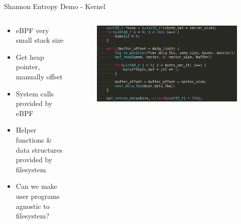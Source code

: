 \documentclass[aspectratio=169, notes]{beamer}
\begin{document}
\begin{frame}{Shannon Entropy Demo - Kernel}
        \begin{columns}
            \begin{column}{0.40\textwidth}
                \footnotesize
                \begin{itemize}
                    \item eBPF very small stack size
                    \item Get heap pointer, manually offset
                    \item System calls provided by eBPF
                    \item Helper functions \& data structures provided
                          by filesystem
                    \item Can we make user programs agnostic to filesystem?
                \end{itemize}
            \end{column}
            \begin{column}{0.60\textwidth}
                \begingroup
                \small
                \begin{figure}
                    \centering
                    \includegraphics[width=1\textwidth]{resources/images/demo-kernel.png}
                \end{figure}
                \endgroup
            \end{column}
        \end{columns}
\end{frame}
\end{document}

